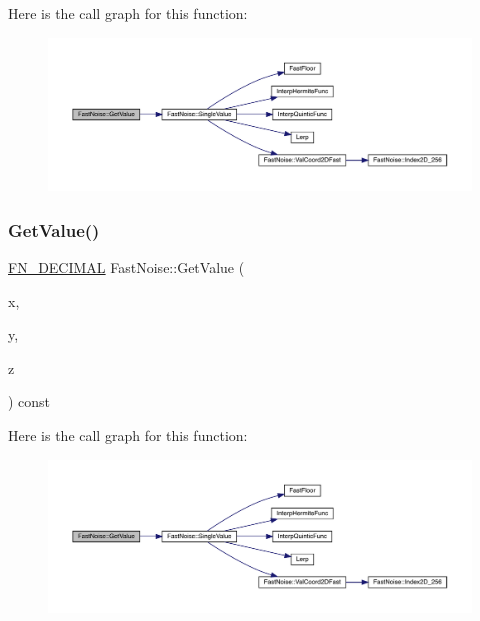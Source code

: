 Here is the call graph for this function\+:
\nopagebreak
\begin{figure}[H]
\begin{center}
\leavevmode
\includegraphics[width=350pt]{class_fast_noise_a14145aaff0f8502eb5fd0f168562c69c_cgraph}
\end{center}
\end{figure}
\mbox{\label{class_fast_noise_ab2424cc7921a15da6eb683ab3bbfcbac}} 
\subsubsection{\texorpdfstring{Get\+Value()}{GetValue()}\hspace{0.1cm}{\footnotesize\ttfamily [2/2]}}
{\footnotesize\ttfamily \mbox{\hyperlink{_fast_noise_8h_a75a9ef6d2541c4921815b885bfd449c3}{F\+N\+\_\+\+D\+E\+C\+I\+M\+AL}} Fast\+Noise\+::\+Get\+Value (\begin{DoxyParamCaption}\item[{\mbox{\hyperlink{_fast_noise_8h_a75a9ef6d2541c4921815b885bfd449c3}{F\+N\+\_\+\+D\+E\+C\+I\+M\+AL}}}]{x,  }\item[{\mbox{\hyperlink{_fast_noise_8h_a75a9ef6d2541c4921815b885bfd449c3}{F\+N\+\_\+\+D\+E\+C\+I\+M\+AL}}}]{y,  }\item[{\mbox{\hyperlink{_fast_noise_8h_a75a9ef6d2541c4921815b885bfd449c3}{F\+N\+\_\+\+D\+E\+C\+I\+M\+AL}}}]{z }\end{DoxyParamCaption}) const}

Here is the call graph for this function\+:
\nopagebreak
\begin{figure}[H]
\begin{center}
\leavevmode
\includegraphics[width=350pt]{class_fast_noise_ab2424cc7921a15da6eb683ab3bbfcbac_cgraph}
\end{center}
\end{figure}
\mbox{\label{class_fast_noise_a637789887aa7727d701d9dbcb261a170}} 
